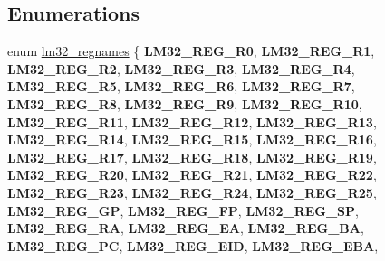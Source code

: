 \subsection*{Enumerations}
\begin{DoxyCompactItemize}
\item 
\mbox{\label{group__lm32__gdb_ga2efe8393b8be167a91473101d94846bf}} 
enum \mbox{\hyperlink{group__lm32__gdb_ga2efe8393b8be167a91473101d94846bf}{lm32\+\_\+regnames}} \{ \newline
{\bfseries L\+M32\+\_\+\+R\+E\+G\+\_\+\+R0}, 
{\bfseries L\+M32\+\_\+\+R\+E\+G\+\_\+\+R1}, 
{\bfseries L\+M32\+\_\+\+R\+E\+G\+\_\+\+R2}, 
{\bfseries L\+M32\+\_\+\+R\+E\+G\+\_\+\+R3}, 
\newline
{\bfseries L\+M32\+\_\+\+R\+E\+G\+\_\+\+R4}, 
{\bfseries L\+M32\+\_\+\+R\+E\+G\+\_\+\+R5}, 
{\bfseries L\+M32\+\_\+\+R\+E\+G\+\_\+\+R6}, 
{\bfseries L\+M32\+\_\+\+R\+E\+G\+\_\+\+R7}, 
\newline
{\bfseries L\+M32\+\_\+\+R\+E\+G\+\_\+\+R8}, 
{\bfseries L\+M32\+\_\+\+R\+E\+G\+\_\+\+R9}, 
{\bfseries L\+M32\+\_\+\+R\+E\+G\+\_\+\+R10}, 
{\bfseries L\+M32\+\_\+\+R\+E\+G\+\_\+\+R11}, 
\newline
{\bfseries L\+M32\+\_\+\+R\+E\+G\+\_\+\+R12}, 
{\bfseries L\+M32\+\_\+\+R\+E\+G\+\_\+\+R13}, 
{\bfseries L\+M32\+\_\+\+R\+E\+G\+\_\+\+R14}, 
{\bfseries L\+M32\+\_\+\+R\+E\+G\+\_\+\+R15}, 
\newline
{\bfseries L\+M32\+\_\+\+R\+E\+G\+\_\+\+R16}, 
{\bfseries L\+M32\+\_\+\+R\+E\+G\+\_\+\+R17}, 
{\bfseries L\+M32\+\_\+\+R\+E\+G\+\_\+\+R18}, 
{\bfseries L\+M32\+\_\+\+R\+E\+G\+\_\+\+R19}, 
\newline
{\bfseries L\+M32\+\_\+\+R\+E\+G\+\_\+\+R20}, 
{\bfseries L\+M32\+\_\+\+R\+E\+G\+\_\+\+R21}, 
{\bfseries L\+M32\+\_\+\+R\+E\+G\+\_\+\+R22}, 
{\bfseries L\+M32\+\_\+\+R\+E\+G\+\_\+\+R23}, 
\newline
{\bfseries L\+M32\+\_\+\+R\+E\+G\+\_\+\+R24}, 
{\bfseries L\+M32\+\_\+\+R\+E\+G\+\_\+\+R25}, 
{\bfseries L\+M32\+\_\+\+R\+E\+G\+\_\+\+GP}, 
{\bfseries L\+M32\+\_\+\+R\+E\+G\+\_\+\+FP}, 
\newline
{\bfseries L\+M32\+\_\+\+R\+E\+G\+\_\+\+SP}, 
{\bfseries L\+M32\+\_\+\+R\+E\+G\+\_\+\+RA}, 
{\bfseries L\+M32\+\_\+\+R\+E\+G\+\_\+\+EA}, 
{\bfseries L\+M32\+\_\+\+R\+E\+G\+\_\+\+BA}, 
\newline
{\bfseries L\+M32\+\_\+\+R\+E\+G\+\_\+\+PC}, 
{\bfseries L\+M32\+\_\+\+R\+E\+G\+\_\+\+E\+ID}, 
{\bfseries L\+M32\+\_\+\+R\+E\+G\+\_\+\+E\+BA}, 

\end{DoxyCompactItemize}
